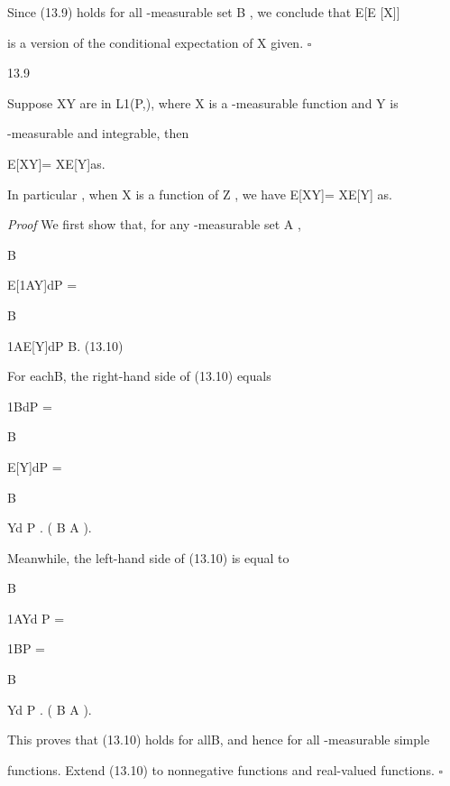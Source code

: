 Since (13.9) holds for all -measurable set B , we conclude that E[E [X\vert{}]\vert{}]

is a version of the conditional expectation of X given. \hfill $\square$

\begin{thmbox}{13.9}
\end{thmbox}

Suppose XY are in L1(P,), where X is a -measurable function and Y is

-measurable and integrable, then

E[XY\vert{}]= XE[Y\vert{}]as.

In particular , when X is a function of Z , we have E[XY\vertZ]= XE[Y\vertZ] as.

\textit{Proof} We first show that, for any -measurable set A ,

\int

B

E[1AY\vert{}]dP =

\int

B

1AE[Y\vert{}]dP B\in {}. (13.10)

For eachB\in {}, the right-hand side of (13.10) equals

\int

1BdP =

\int

B\capA

E[Y\vert{}]dP =

\int

B\capA

Yd P . ( B \cap A \in{}).

Meanwhile, the left-hand side of (13.10) is equal to

\int

B

1AYd P =

\int

1B\capAYd P =

\int

B\capA

Yd P . ( B \cap A \in{}).

This proves that (13.10) holds for allB\in {}, and hence for all -measurable simple

functions. Extend (13.10) to nonnegative functions and real-valued functions. \hfill $\square$

